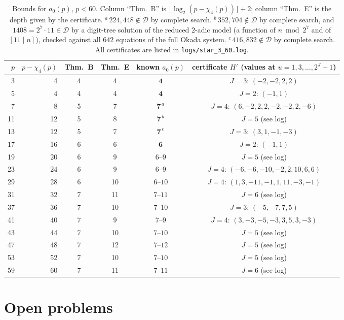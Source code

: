 \documentclass[11pt,a4paper]{article}
\theoremstyle{definition}
\theoremstyle{remark}
\newcommand{\cD}{\mathcal{D}}
\begin{document}
\begin{table}[ht]
\centering\footnotesize
\begin{tabular}{@{}rrcccc@{}}
\toprule
$p$ & $p-\chi_4(p)$ & Thm.~B & Thm.~E & known $a_0(p)$ & certificate $H'$ (values at $u=1,3,\dots,2^J-1$)\\
\midrule
3 & 4 & 4 & 4 & $\mathbf 4$ & $J=3$: $(-2,-2,2,2)$\\
5 & 4 & 4 & 4 & $\mathbf 4$ & $J=2$: $(-1,1)$\\
7 & 8 & 5 & 7 & $\mathbf 7^{\,a}$ & $J=4$: $(6,-2,2,2,-2,-2,2,-6)$\\
11 & 12 & 5 & 8 & $\mathbf 7^{\,b}$ & $J=5$ (see log)\\
13 & 12 & 5 & 7 & $\mathbf 7^{\,c}$ & $J=3$: $(3,1,-1,-3)$\\
17 & 16 & 6 & 6 & $\mathbf 6$ & $J=2$: $(-1,1)$\\
19 & 20 & 6 & 9 & $6$--$9$ & $J=5$ (see log)\\
23 & 24 & 6 & 9 & $6$--$9$ & $J=4$: $(-6,-6,-10,-2,2,10,6,6)$\\
29 & 28 & 6 & 10 & $6$--$10$ & $J=4$: $(1,3,-11,-1,1,11,-3,-1)$\\
31 & 32 & 7 & 11 & $7$--$11$ & $J=6$ (see log)\\
37 & 36 & 7 & 10 & $7$--$10$ & $J=3$: $(-5,-7,7,5)$\\
41 & 40 & 7 & 9 & $7$--$9$ & $J=4$: $(3,-3,-5,-3,3,5,3,-3)$\\
43 & 44 & 7 & 10 & $7$--$10$ & $J=5$ (see log)\\
47 & 48 & 7 & 12 & $7$--$12$ & $J=5$ (see log)\\
53 & 52 & 7 & 10 & $7$--$10$ & $J=5$ (see log)\\
59 & 60 & 7 & 11 & $7$--$11$ & $J=6$ (see log)\\
\bottomrule
\end{tabular}
\caption{Bounds for $a_0(p)$, $p<60$. Column ``Thm.~B'' is $\lfloor\log_2(p-\chi_4(p))\rfloor+2$; column ``Thm.~E'' is the depth given by the certificate. $^a$\,$224,448\notin\cD$ by complete search. $^b$\,$352,704\notin\cD$ by complete search, and $1408=2^7\cdot11\in\cD$ by a digit-tree solution of the reduced $2$-adic model (a function of $n\bmod 2^7$ and of $[11\mid n]$), checked against all $642$ equations of the full Okada system. $^c$\,$416,832\notin\cD$ by complete search. All certificates are listed in \texttt{logs/star\_3\_60.log}.}\label{tab:thresholds}
\end{table}

\section{Open problems}\label{sec:open}
\end{document}
